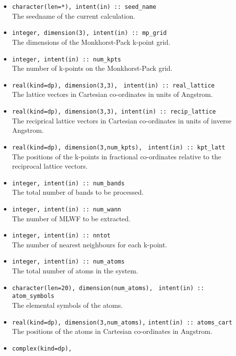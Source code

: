 \begin{itemize}
\item \verb#character(len=*), intent(in) :: seed_name#\\ The seedname
  of the current calculation.
\item \verb#integer, dimension(3), intent(in) :: mp_grid#\\ The
  dimensions of the {Monkhorst-Pack} k-point grid.
\item \verb#integer, intent(in) :: num_kpts#\\ The number of k-points on
  the {Monkhorst-Pack} grid.
\item \verb#real(kind=dp), dimension(3,3),#
      \verb# intent(in) :: real_lattice#\\ The lattice vectors in
      Cartesian co-ordinates in units of Angstrom. 
\item \verb#real(kind=dp), dimension(3,3), intent(in) :: recip_lattice#\\
  The reciprical lattice vectors in Cartesian co-ordinates in units of inverse Angstrom.
\item \verb#real(kind=dp), dimension(3,num_kpts),#
      \verb# intent(in) :: kpt_latt#\\ The positions of the k-points in
      fractional co-ordinates relative to the reciprocal lattice
      vectors.
\item \verb#integer, intent(in) :: num_bands#\\ The total number of
      bands to be processed.
\item \verb#integer, intent(in) :: num_wann#\\ The number of MLWF to
  be extracted. 
\item \verb#integer, intent(in) :: nntot#\\ The number of
  nearest neighbours for each k-point.
\item \verb#integer, intent(in) :: num_atoms#\\ The total number of atoms
  in the system.
\item \verb#character(len=20), dimension(num_atoms),#
      \verb# intent(in) :: atom_symbols#\\ The elemental symbols of
      the atoms.
\item \verb#real(kind=dp), dimension(3,num_atoms),#
      \verb#intent(in) :: atoms_cart#\\ The positions of the atoms in
      Cartesian co-ordinates in Angstrom.
\item \verb#complex(kind=dp),#

\end{itemize}
